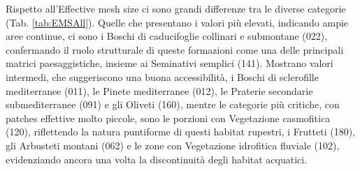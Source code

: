 \documentclass[
]{book}
\begin{document}
Rispetto all'Effective mesh size ci sono grandi differenze tra le diverse categorie (Tab. \ref{tab:EMSAll}).
Quelle che presentano i valori più elevati, indicando ampie aree continue, ci sono i Boschi di caducifoglie collinari e submontane (022), confermando il ruolo strutturale di queste formazioni come una delle principali matrici paesaggistiche, insieme ai Seminativi semplici (141).
Mostrano valori intermedi, che suggeriscono una buona accessibilità, i Boschi di sclerofille mediterranee (011), le Pinete mediterranee (012), le Praterie secondarie submediterranee (091) e gli Oliveti (160), mentre le categorie più critiche, con patches effettive molto piccole, sono le porzioni con Vegetazione casmofitica (120), riflettendo la natura puntiforme di questi habitat rupestri, i Frutteti (180), gli Arbusteti montani (062) e le zone con Vegetazione idrofitica fluviale (102), evidenziando ancora una volta la discontinuità degli habitat acquatici.
\end{document}
